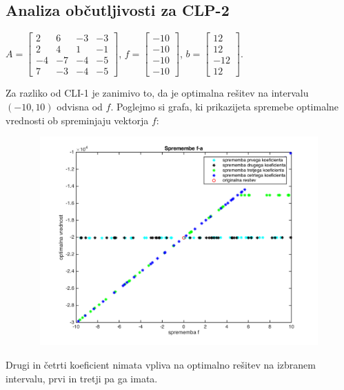 \documentclass[a4paper,12pt]{article}
\begin{document}
\newpage
\subsection{Analiza občutljivosti za CLP-2}

\begin{center}
$ A = \begin{bmatrix}
  2 & 6 & -3 & -3 \\
  2 & 4 & 1 & -1 \\
  -4 & -7 & -4 & -5 \\
   7 & -3 & -4 & -5  
\end{bmatrix} $, $f=\begin{bmatrix} -10 \\-10 \\-10\\ -10 \end{bmatrix}$, $b=\begin{bmatrix} 12 \\12 \\-12\\12 \end{bmatrix}.$
\\[0.5cm]
\end{center}

Za razliko od CLI-1 je zanimivo to, da je optimalna rešitev na intervalu $(-10,10)$ odvisna od $f$. Poglejmo si grafa, ki prikazijeta spremebe optimalne vrednosti ob spreminjaju vektorja $f$:

\begin{figure}[h!]
\includegraphics[width=11.2cm,height=8cm]{spremembe_f.png}
\centering
\end{figure}

Drugi in četrti koeficient nimata vpliva na optimalno rešitev na izbranem intervalu, prvi in tretji pa ga imata.
 
\end{document}
